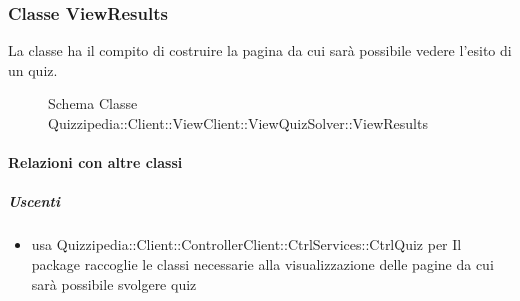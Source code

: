 \subsubsection{Classe ViewResults}
La classe ha il compito di costruire la pagina da cui sarà possibile vedere l'esito di un quiz.
\begin{figure}[H]
\centering
\noindent{}
\caption[Schema Classe ViewResults]{Schema Classe Quizzipedia::Client::ViewClient::ViewQuizSolver::ViewResults}
\end{figure}
\paragraph{Relazioni con altre classi}
\subparagraph{Uscenti}
\begin{itemize}
\item usa Quizzipedia::Client::ControllerClient::CtrlServices::CtrlQuiz per Il package raccoglie le classi necessarie alla visualizzazione delle pagine da cui sarà possibile svolgere quiz
\end{itemize}
